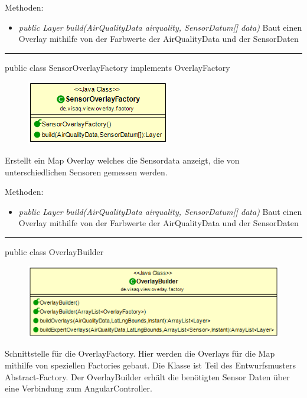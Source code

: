 Methoden:
\begin{itemize}
    \item \emph{public Layer build(AirQualityData airquality, SensorDatum[] data)}  Baut einen Overlay mithilfe von der Farbwerte der AirQualityData und der SensorDaten
\end{itemize}

\rule{\textwidth}{0.4pt}
public class SensorOverlayFactory implements OverlayFactory

\begin{minipage}{0.3\textwidth}
    \begin{figure}[H]
        \includegraphics[scale = 0.5]{media/frontend/view/de.view.overlay.factory/SensorOverlayFactory_Class.png}
    \end{figure}
    \end{minipage} \hfill
    \begin{minipage}{0.6\textwidth}
        Erstellt ein Map Overlay welches die Sensordata anzeigt, die von unterschiedlichen Sensoren gemessen werden.
\end{minipage}

Methoden:
\begin{itemize}
    \item \emph{public Layer build(AirQualityData airquality, SensorDatum[] data)}  Baut einen Overlay mithilfe von der Farbwerte der AirQualityData und der SensorDaten
\end{itemize}

\rule{\textwidth}{0.4pt}
public class OverlayBuilder

\begin{minipage}{0.6\textwidth}
    \begin{figure}[H]
        \includegraphics[scale = 0.5]{media/frontend/view/de.view.overlay.factory/OverlayBuilder_Class.png}
    \end{figure}
    \end{minipage} \hfill
    \begin{minipage}{0.4\textwidth}
Schnittstelle für die OverlayFactory. Hier werden die Overlays für die Map mithilfe von speziellen Factories gebaut. Die Klasse ist Teil des Entwurfsmusters Abstract-Factory. Der OverlayBuilder erhält die benötigten Sensor Daten über eine Verbindung zum AngularController.
\end{minipage}

